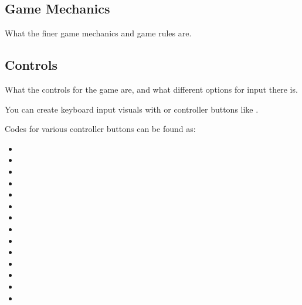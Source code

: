 \subsection{Game Mechanics}
What the finer game mechanics and game rules are.
\subsection{Controls}
What the controls for the game are, and what different options for input there is.

You can create keyboard input visuals with  or controller buttons like \controllerA.

Codes for various controller buttons can be found as:
\begin{itemize}
\item \controllerA \hspace{1pt} \texttt{\controllerA}
\item \controllerB \hspace{1pt} \texttt{\controllerB}
\item \controllerX \hspace{1pt} \texttt{\controllerX}
\item \controllerY \hspace{1pt} \texttt{\controllerY}
\item \controllerDpad \hspace{1pt} \texttt{\controllerDpad}
\item \controllerDpadUp \hspace{1pt} \texttt{\controllerDpadUp}
\item \controllerDpadLeft \hspace{1pt} \texttt{\controllerDpadLeft}
\item \controllerDpadDown \hspace{1pt} \texttt{\controllerDpadDown}
\item \controllerDpadRight \hspace{1pt} \texttt{\controllerDpadRight}
\item \controllerJoystick \hspace{1pt} \texttt{\controllerJoystick}
\item \controllerJoystickUp \hspace{1pt} \texttt{\controllerJoystickUp}
\item \controllerJoystickLeft \hspace{1pt} \texttt{\controllerJoystickLeft}
\item \controllerJoystickDown \hspace{1pt} \texttt{\controllerJoystickDown}
\item \controllerJoystickRight \hspace{1pt} \texttt{\controllerJoystickRight}
\end{itemize}

